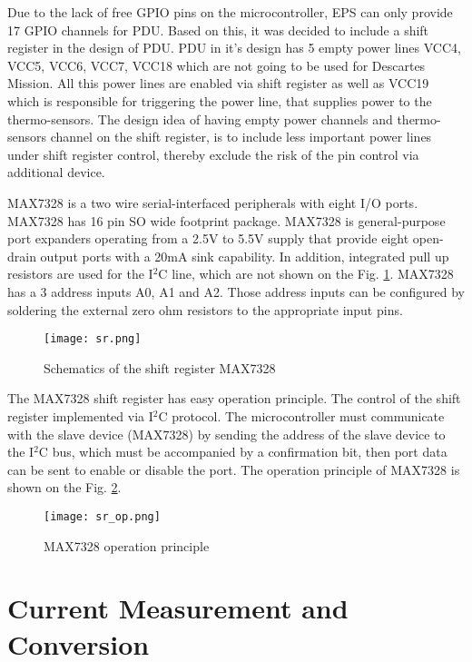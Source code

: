 Due to the lack of free GPIO pins on the microcontroller, EPS can only provide 17 GPIO channels for PDU. Based on this, it was decided to include a shift register in the design of PDU. PDU in it's design has 5 empty power lines VCC4, VCC5, VCC6, VCC7, VCC18 which are not going to be used for Descartes Mission. All this power lines are enabled via shift register as well as VCC19 which is responsible for triggering the power line, that supplies power to the thermo-sensors. The design idea of having empty power channels and thermo-sensors channel on the shift register, is to include less important power lines under shift register control, thereby exclude the risk of the pin control via additional device. 


 MAX7328 is a two wire  serial-interfaced peripherals with eight I/O ports. MAX7328 has 16 pin SO wide footprint package. \cite{29} MAX7328 is general-purpose port expanders operating from a 2.5V to 5.5V supply that provide eight open-drain output ports with a 20mA sink capability. In addition, integrated pull up resistors are used for the I$^2$C line, which are not shown on the Fig. \ref{fig: sr1}.       MAX7328 has a 3 address inputs A0, A1 and A2. Those address inputs can be configured by soldering the external zero ohm resistors to the appropriate input pins.  


\begin{figure}[h]
	\centering
	\texttt{[image: sr.png]}
	\caption{ Schematics of the shift register MAX7328}
	\label{fig: sr1}
\end{figure}

The MAX7328 shift register has easy operation principle. The control of the shift register implemented via I$^2$C protocol. The microcontroller must communicate with the slave device (MAX7328) by sending the address of the slave device to the I$^2$C bus, which must be accompanied by a confirmation bit, then port data can be sent to enable or disable the port. The operation principle of MAX7328 is shown on the Fig. \ref{fig: sr_op1}. 
\newpage
\begin{figure}[h]
	\centering
	\texttt{[image: sr\_op.png]}
	\caption{ MAX7328 operation principle\cite{29}}
	\label{fig: sr_op1}
\end{figure}
 
\section{Current Measurement and Conversion}


